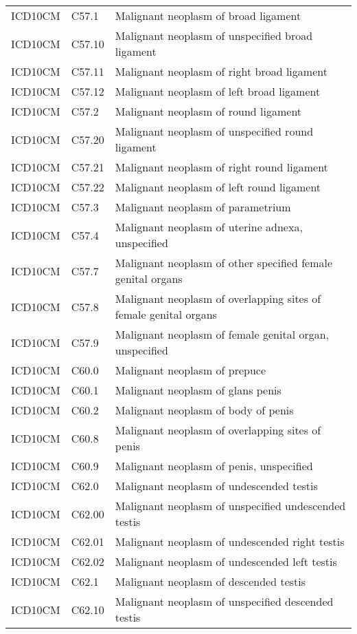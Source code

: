 \begin{longtable}{p{}p{}p{}}
  ICD10CM & C57.1 & Malignant neoplasm of broad ligament \\ 
  ICD10CM & C57.10 & Malignant neoplasm of unspecified broad ligament \\ 
  ICD10CM & C57.11 & Malignant neoplasm of right broad ligament \\ 
  ICD10CM & C57.12 & Malignant neoplasm of left broad ligament \\ 
  ICD10CM & C57.2 & Malignant neoplasm of round ligament \\ 
  ICD10CM & C57.20 & Malignant neoplasm of unspecified round ligament \\ 
  ICD10CM & C57.21 & Malignant neoplasm of right round ligament \\ 
  ICD10CM & C57.22 & Malignant neoplasm of left round ligament \\ 
  ICD10CM & C57.3 & Malignant neoplasm of parametrium \\ 
  ICD10CM & C57.4 & Malignant neoplasm of uterine adnexa, unspecified \\ 
  ICD10CM & C57.7 & Malignant neoplasm of other specified female genital organs \\ 
  ICD10CM & C57.8 & Malignant neoplasm of overlapping sites of female genital organs \\ 
  ICD10CM & C57.9 & Malignant neoplasm of female genital organ, unspecified \\ 
  ICD10CM & C60.0 & Malignant neoplasm of prepuce \\ 
  ICD10CM & C60.1 & Malignant neoplasm of glans penis \\ 
  ICD10CM & C60.2 & Malignant neoplasm of body of penis \\ 
  ICD10CM & C60.8 & Malignant neoplasm of overlapping sites of penis \\ 
  ICD10CM & C60.9 & Malignant neoplasm of penis, unspecified \\ 
  ICD10CM & C62.0 & Malignant neoplasm of undescended testis \\ 
  ICD10CM & C62.00 & Malignant neoplasm of unspecified undescended testis \\ 
  ICD10CM & C62.01 & Malignant neoplasm of undescended right testis \\ 
  ICD10CM & C62.02 & Malignant neoplasm of undescended left testis \\ 
  ICD10CM & C62.1 & Malignant neoplasm of descended testis \\ 
  ICD10CM & C62.10 & Malignant neoplasm of unspecified descended testis \\ 

\end{longtable}
